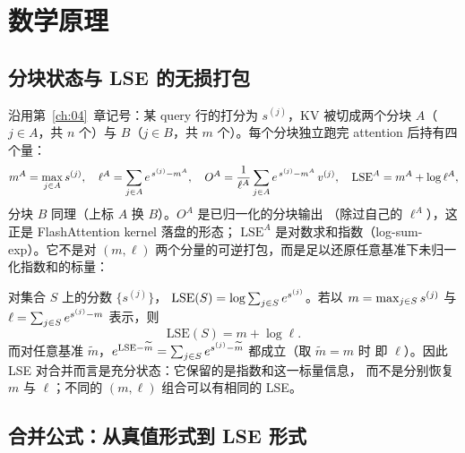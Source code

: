 \section{数学原理}

\subsection{分块状态与 LSE 的无损打包}

沿用第~\ref{ch:04}~章记号：某 query 行的打分为 $s^{(j)}$，KV 被切成两个分块
$A$（$j \in A$，共 $n$ 个）与 $B$（$j \in B$，共 $m$ 个）。每个分块独立跑完
attention 后持有四个量：
\begin{equation}
  m^{A} = \max\sb{j \in A} s^{(j)}, \quad
  \ell^{A} = \sum\sb{j \in A} e^{\,s^{(j)} - m^{A}}, \quad
  O^{A} = \frac{1}{\ell^{A}} \sum\sb{j \in A} e^{\,s^{(j)} - m^{A}}\, v^{(j)}, \quad
  \mathrm{LSE}^{A} = m^{A} + \log \ell^{A},
  \label{eq:5-chunk-state}
\end{equation}
分块 $B$ 同理（上标 $A$ 换 $B$）。$O^{A}$ 是已归一化的分块输出
（除过自己的 $\ell^{A}$），这正是 FlashAttention kernel 落盘的形态；
$\mathrm{LSE}^{A}$ 是对数求和指数（log-sum-exp）。它不是对 $(m,\ell)$ 两个分量的可逆打包，而是足以还原任意基准下未归一化指数和的标量：

\begin{definition}[LSE]\label{def:lse}
  对集合 $S$ 上的分数 $\{s^{(j)}\}$，
  $\mathrm{LSE}(S) = \log \sum\sb{j \in S} e^{s^{(j)}}$。若以 $m = \max\sb{j\in S} s^{(j)}$
  与 $\ell = \sum\sb{j \in S} e^{s^{(j)} - m}$ 表示，则
  \begin{equation}
    \mathrm{LSE}(S) = m + \log \ell .
    \label{eq:5-lse-def}
  \end{equation}
  而对任意基准 $\tilde m$，$e^{\mathrm{LSE} - \tilde m}
  = \sum\sb{j \in S} e^{s^{(j)} - \tilde m}$ 都成立（取 $\tilde m = m$ 时
  即 $\ell$）。因此 LSE 对合并而言是充分状态：它保留的是指数和这一标量信息，
  而不是分别恢复 $m$ 与 $\ell$；不同的 $(m,\ell)$ 组合可以有相同的 LSE。
\end{definition}

\subsection{合并公式：从真值形式到 LSE 形式}


